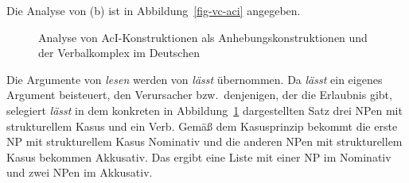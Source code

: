 Die Analyse von (b) ist in Abbildung~\vref{fig-vc-aci} angegeben.
\begin{figure}
\caption{\label{fig-vc-aci}Analyse von AcI-Konstruktionen als Anhebungskonstruktionen und der Verbalkomplex im Deutschen}
\end{figure}
Die Argumente von \emph{lesen} werden von \emph{lässt} übernommen. Da \emph{lässt}
ein eigenes Argument beisteuert, den Verursacher bzw.\ denjenigen, der die Erlaubnis gibt, selegiert \emph{lässt}
in dem konkreten in Abbildung~\ref{fig-vc-aci} dargestellten Satz drei NPen mit strukturellem Kasus und ein Verb. Gemäß dem Kasusprinzip bekommt die erste NP mit strukturellem Kasus
Nominativ und die anderen NPen mit strukturellem Kasus bekommen Akkusativ. Das ergibt eine Liste mit einer
NP im Nominativ und zwei NPen im Akkusativ.

